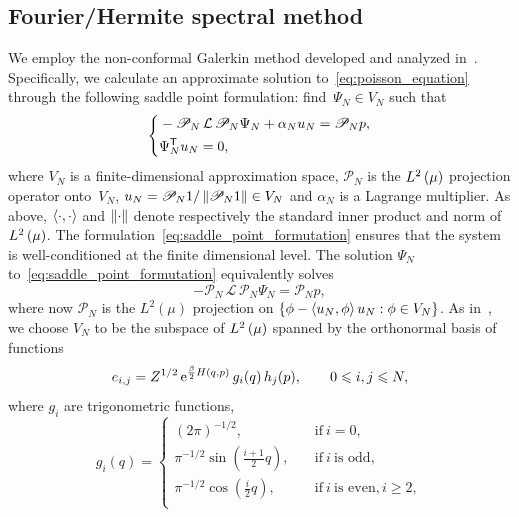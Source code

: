 \documentclass[11pt,a4paper]{article}
\begin{document}
\subsection{Fourier/Hermite spectral method}%
\label{sub:galerkin_approach}
We employ the non-conformal Galerkin method developed and analyzed in~\cite{roussel2018spectral}.
Specifically, we calculate an approximate solution to~\eqref{eq:poisson_equation} through the following saddle point formulation:
find~$\Psi_N \in V_N$ such that
\begin{align}
  \label{eq:saddle_point_formutation}
  \left\{
    \begin{aligned}
       & - \mathscr P_N \, \mathcal L \, \mathscr P_N \Psi_N + \alpha_N u_N = \mathscr P_N p, \\
       & \Psi_N^\mathsf T u_N = 0,
    \end{aligned}
  \right.
\end{align}
where $V_N$ is a finite-dimensional approximation space,
$\mathscr P_N$ is the $\lp{2}{\mu}$ projection operator onto~$V_N$,
$u_N = \mathscr P_N 1 / \norm{\mathscr P_N 1} \in V_N$
and $\alpha_N$ is a Lagrange multiplier.
As above,
$\ip{\cdot}{\cdot}$ and $\norm{\cdot}$ denote respectively the standard inner product and norm of $\lp{2}{\mu}$.
The formulation~\eqref{eq:saddle_point_formutation} ensures
that the system is well-conditioned at the finite dimensional level.
The solution $\Psi_N$ to~\eqref{eq:saddle_point_formutation} equivalently solves
\[
    - \mathcal P_N \, \mathcal L \, \mathcal P_N \Psi_N = \mathcal P_N p,
\]
where now $\mathcal P_N$ is the $L^2(\mu)$ projection on $\{\phi - \ip{u_N}{\phi} u_N : \phi \in V_N\}$.
As in~\cite{roussel2018spectral},
we choose $V_N$ to be the subspace of $\lp{2}{\mu}$ spanned by the orthonormal basis of functions
\begin{equation}
  \label{eq:basis_functions}
  e_{i,j} = Z^{1/2} \, \mathrm{e}^{\frac{\beta}{2} H(q,p)}
  \, g_i(q) \, h_j(p), \qquad 0 \leqslant i,j \leqslant N,
\end{equation}
where $g_i$ are trigonometric functions,
\begin{equation}
  \label{eq:definition_trigonometric_functions}
  g_i(q) =
  \left\{ \begin{aligned}
    (2 \pi)^{-1/2}, \quad & \text{if}~i = 0, \\
    \pi^{-1/2} \sin\left(\frac{i + 1}{2}q\right), \quad & \text{if}~i~\text{is odd}, \\
    \pi^{-1/2} \cos\left(\frac{i}{2}q\right), \quad & \text{if}~i~\text{is even}, i \geq 2, \\
  \end{aligned} \right.
\end{equation}
\end{document}
